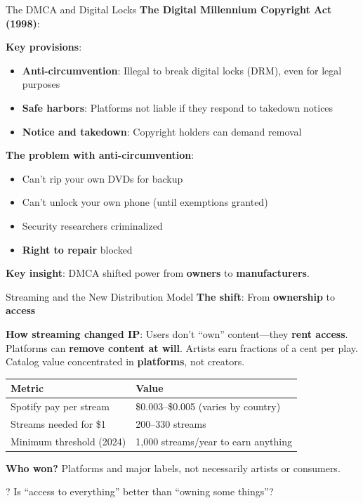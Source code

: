 \documentclass[aspectratio=169]{beamer}
\begin{document}
\begin{frame}{The DMCA and Digital Locks}
\textbf{The Digital Millennium Copyright Act (1998)}:

\vspace{0.2cm}
\textbf{Key provisions}:
\begin{itemize}
    \item \textbf{Anti-circumvention}: Illegal to break digital locks (DRM), even for legal purposes
    \item \textbf{Safe harbors}: Platforms not liable if they respond to takedown notices
    \item \textbf{Notice and takedown}: Copyright holders can demand removal
\end{itemize}

\vspace{0.3cm}
\textbf{The problem with anti-circumvention}:
\begin{itemize}
    \item Can't rip your own DVDs for backup
    \item Can't unlock your own phone (until exemptions granted)
    \item Security researchers criminalized
    \item \textbf{Right to repair} blocked
\end{itemize}

\vspace{0.2cm}
\textbf{Key insight}: DMCA shifted power from \textbf{owners} to \textbf{manufacturers}.
\end{frame}

\begin{frame}{Streaming and the New Distribution Model}
\textbf{The shift}: From \textbf{ownership} to \textbf{access}

\vspace{0.1cm}
\textbf{How streaming changed IP}: Users don't ``own'' content---they \textbf{rent access}. Platforms can \textbf{remove content at will}. Artists earn fractions of a cent per play. Catalog value concentrated in \textbf{platforms}, not creators.

\vspace{0.1cm}
\begin{table}[h]
\centering
\small
\begin{tabular}{l l}
\toprule
\textbf{Metric} & \textbf{Value} \\
\midrule
Spotify pay per stream & \$0.003--\$0.005 (varies by country) \\
Streams needed for \$1 & 200--330 streams \\
Minimum threshold (2024) & 1,000 streams/year to earn anything \\
\bottomrule
\end{tabular}
\end{table}

\textbf{Who won?} Platforms and major labels, not necessarily artists or consumers.

\begin{alertblock}{?}
Is ``access to everything'' better than ``owning some things''?
\end{alertblock}
\end{frame}
\end{document}
